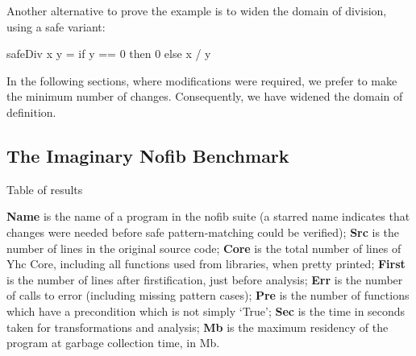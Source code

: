 \documentclass[preprint]{sigplanconf}
\newcommand{\C}[1]{\textsf{#1}}
\begin{document}
Another alternative to prove the example is to widen the domain of division, using a safe variant:

\begin{code}
safeDiv x y = if y == 0 then 0 else x / y
\end{code}

In the following sections, where modifications were required, we prefer to make the minimum number of changes. Consequently, we have widened the domain of definition.

\subsection{The Imaginary Nofib Benchmark}
\label{sec:imaginary}

\begin{table}
\caption{Table of results}
\label{tab:results}

\smallskip

\textbf{Name} is the name of a program in the nofib suite (a starred name indicates that changes were needed before safe pattern-matching could be verified);
\textbf{Src} is the number of lines in the original source code;
\textbf{Core} is the total number of lines of Yhc Core, including all functions used from libraries, when pretty printed;
\textbf{First} is the number of lines after firstification, just before analysis;
\textbf{Err} is the number of calls to \C{error} (including missing pattern cases);
\textbf{Pre} is the number of functions which have a precondition which is not simply `True';
\textbf{Sec} is the time in seconds taken for transformations and analysis;
\textbf{Mb} is the maximum residency of the program at garbage collection time, in Mb.

\smallskip\smallskip


\end{table}
\end{document}
